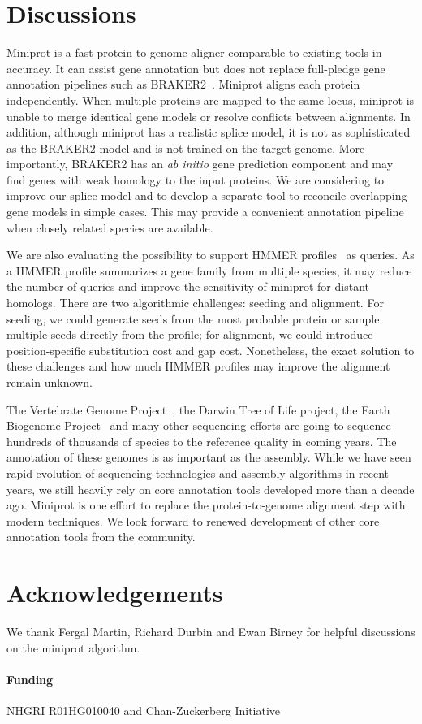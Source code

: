 \documentclass{bioinfo}
\begin{document}
\section{Discussions}

Miniprot is a fast protein-to-genome aligner comparable to existing tools in
accuracy. It can assist gene annotation but does not replace full-pledge gene
annotation pipelines such as BRAKER2~\citep{Bruna:2021ug}.  Miniprot aligns
each protein independently. When multiple proteins are mapped to the same
locus, miniprot is unable to merge identical gene models or resolve conflicts
between alignments. In addition, although miniprot has a realistic splice
model, it is not as sophisticated as the BRAKER2 model and is not trained on
the target genome. More importantly, BRAKER2 has an \emph{ab initio} gene
prediction component and may find genes with weak homology to the input
proteins. We are considering to improve our splice model and to develop a
separate tool to reconcile overlapping gene models in simple cases. This may
provide a convenient annotation pipeline when closely related species are
available.

We are also evaluating the possibility to support HMMER
profiles~\citep{Eddy:2011tg} as queries. As a HMMER profile summarizes a gene
family from multiple species, it may reduce the number of queries and improve
the sensitivity of miniprot for distant homologs. There are two algorithmic
challenges: seeding and alignment.  For seeding, we could generate seeds from
the most probable protein or sample multiple seeds directly from the profile;
for alignment, we could introduce position-specific substitution cost and gap
cost. Nonetheless, the exact solution to these challenges and how much HMMER
profiles may improve the alignment remain unknown.

The Vertebrate Genome Project~\citep{Rhie:2021ug}, the Darwin Tree of Life
project, the Earth Biogenome Project~\citep{Lewin:2018ve} and many other sequencing efforts are
going to sequence hundreds of thousands of species to the reference quality in
coming years. The annotation of these genomes is as important as the assembly.
While we have seen rapid evolution of sequencing technologies and assembly
algorithms in recent years, we still heavily rely on core annotation tools
developed more than a decade ago. Miniprot is one effort to replace the
protein-to-genome alignment step with modern techniques. We look forward to
renewed development of other core annotation tools from the community.

\section*{Acknowledgements}

We thank Fergal Martin, Richard Durbin and Ewan Birney for helpful discussions
on the miniprot algorithm.

\paragraph{Funding\textcolon} NHGRI R01HG010040 and Chan-Zuckerberg Initiative


\end{document}
